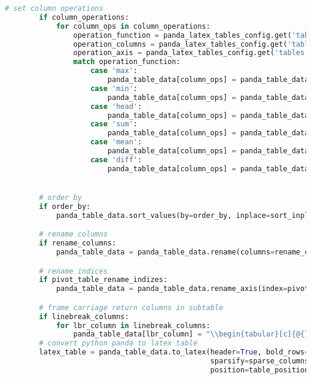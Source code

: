 \begin{lstlisting}[language=python, caption=pandas_dataframe_to_latex_table.py CSV - LaTex Tabelle,captionpos=b,label={lst:Python LaTex - pandas_dataframe_to_latex_table},breaklines=true]
        # set column operations
        if column_operations:
            for column_ops in column_operations:
                operation_function = panda_latex_tables_config.get('tables').get(table_item).get('column_operations').get('operations').get(column_ops).get('operation_function')
                operation_columns = panda_latex_tables_config.get('tables').get(table_item).get('column_operations').get('operations').get(column_ops).get('columns')
                operation_axis = panda_latex_tables_config.get('tables').get(table_item).get('column_operations').get('operations').get(column_ops).get('axis_number')
                match operation_function:
                    case 'max':
                        panda_table_data[column_ops] = panda_table_data[operation_columns].max()
                    case 'min':
                        panda_table_data[column_ops] = panda_table_data[operation_columns].min()
                    case 'head':
                        panda_table_data[column_ops] = panda_table_data[operation_columns].head()
                    case 'sum':
                        panda_table_data[column_ops] = panda_table_data[operation_columns].sum(axis=operation_axis)
                    case 'mean':
                        panda_table_data[column_ops] = panda_table_data[operation_columns].mean()
                    case 'diff':
                        panda_table_data[column_ops] = panda_table_data[operation_columns[1]] - panda_table_data[operation_columns[0]]


        # order by
        if order_by:
            panda_table_data.sort_values(by=order_by, inplace=sort_inplace, ascending=sort_acending)

        # rename columns
        if rename_columns:
            panda_table_data = panda_table_data.rename(columns=rename_columns)

        # rename indices
        if pivot_table_rename_indizes:
            panda_table_data = panda_table_data.rename_axis(index=pivot_table_rename_indizes)

        # frame carriage return columns in subtable
        if linebreak_columns:
            for lbr_column in linebreak_columns:
                panda_table_data[lbr_column] = "\\begin{tabular}[c]{@{}l@{}}" + panda_table_data[lbr_column].astype(str) + "\\end{tabular}"
        # convert python panda to latex table
        latex_table = panda_table_data.to_latex(header=True, bold_rows=False, longtable=longtable,
                                                sparsify=sparse_columns, label=table_label, caption=table_caption,
                                                position=table_position, na_rep='', index=pivot_table_indizes_visible)


\end{lstlisting}
